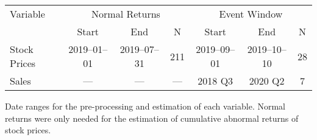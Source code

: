 \documentclass[12pt]{article}
\begin{document}
\begin{table}
    \label{tab:data_freq}
    \centering

    \begin{tabular}{l|ccc|ccc}
        \toprule
        Variable     & \multicolumn{3}{c|}{Normal Returns} & \multicolumn{3}{c}{Event Window} \\
                     & Start & End          & N                 &   Start & End     &     N \\ 
        \midrule
        Stock Prices & 2019--01--01 & 2019--07--31 & 211 & 2019--09--01 & 2019--10--10 & 28\\
        Sales        & ---           &     ---     & --- & 2018 Q3 & 2020 Q2 & 7\\  
        \bottomrule
    \end{tabular}

    \vspace{0.2cm}

    \begin{tablenotes}
        \footnotesize
        \item Date ranges for the pre-processing and estimation of each variable. Normal returns were only needed for the estimation of cumulative abnormal returns of stock prices.
    \end{tablenotes}
\end{table}


\end{document}
